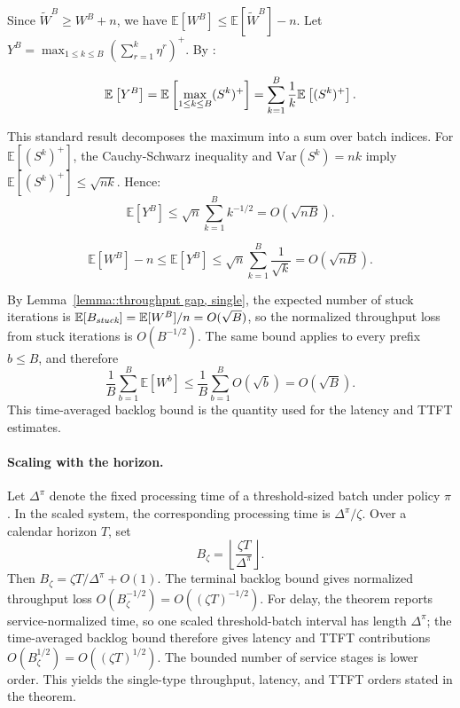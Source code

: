 Since \(\tilde{W}^B \geq W^B + n\), we have \(\mathbb{E}[W^B]\leq \mathbb{E}[\tilde{W}^B]-n\). Let \(Y^B = \max_{1\leq k\leq B}(\sum_{r=1}^{k}\eta^r)^+\). By \cite[Lemma 2]{strait1974maximum}:
\begin{lemma}\label{lem:Y_T}
$$\mathbb{E}_{}\left[Y^B\right]=\mathbb{E}_{}\left[\max_{1\leq k\leq B}(S^k)^+\right]=\sum_{k=1}^B \frac{1}{k}\mathbb{E}_{}\left[(S^k)^+\right].$$
\end{lemma}
\noindent This standard result \citep{strait1974maximum} decomposes the maximum into a sum over batch indices. For \(\mathbb{E}[(S^k)^+]\), the Cauchy-Schwarz inequality and \(\mathrm{Var}(S^k)=nk\) imply \(\mathbb{E}[(S^k)^+] \leq \sqrt{nk}\). Hence:
$$\mathbb{E}[Y^B] \leq \sqrt{n} \sum_{k=1}^B k^{-1/2}=O(\sqrt{nB}).$$

\begin{lemma}\label{lemma::throughput gap}
$$\mathbb{E}[W^B]-n\leq \mathbb{E}[Y^B]\leq  \sqrt{n} \sum_{k=1}^B \frac{1}{\sqrt{k}}=O(\sqrt{nB}).$$
\end{lemma}
\noindent By Lemma~\ref{lemma::throughput gap, single}, the expected number of stuck iterations is \(\mathbb{E}[B_{\emph{stuck}}]=\mathbb{E}[W^B]/n=O(\sqrt{B})\), so the normalized throughput loss from stuck iterations is \(O(B^{-1/2})\). The same bound applies to every prefix \(b\le B\), and therefore
\[
    \frac{1}{B}\sum_{b=1}^B \mathbb{E}[W^b] \leq \frac{1}{B}\sum_{b=1}^B O(\sqrt{b}) = O(\sqrt{B}).
\]
This time-averaged backlog bound is the quantity used for the latency and TTFT estimates.

\paragraph{Scaling with the horizon.} Let \(\Delta^\pi\) denote the fixed processing time of a threshold-sized batch under policy \(\pi\). In the scaled system, the corresponding processing time is \(\Delta^\pi/\zeta\). Over a calendar horizon \(T\), set
\[
    B_\zeta=\left\lfloor \frac{\zeta T}{\Delta^\pi}\right\rfloor .
\]
Then \(B_\zeta=\zeta T/\Delta^\pi+O(1)\). The terminal backlog bound gives normalized throughput loss \(O(B_\zeta^{-1/2})=O((\zeta T)^{-1/2})\). For delay, the theorem reports service-normalized time, so one scaled threshold-batch interval has length \(\Delta^\pi\); the time-averaged backlog bound therefore gives latency and TTFT contributions \(O(B_\zeta^{1/2})=O((\zeta T)^{1/2})\). The bounded number of service stages is lower order. This yields the single-type throughput, latency, and TTFT orders stated in the theorem.

